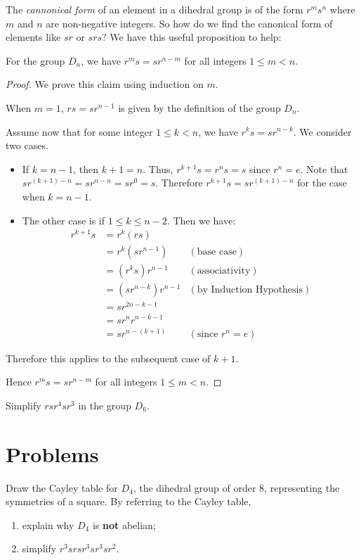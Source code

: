 The \textit{cannonical form} of an element in a dihedral group is of the form $r^ms^n$ where $m$ and $n$ are non-negative integers. So how do we find the canonical form of elements like $sr$ or $srs$? We have this useful proposition to help:
\begin{proposition}
    For the group $D_n$, we have $r^ms = sr^{n-m}$ for all integers $1 \leq m < n$.
\end{proposition}
\begin{proof}
    We prove this claim using induction on $m$.

    When $m = 1$, $rs = sr^{n-1}$ is given by the definition of the group $D_n$.

    Assume now that for some integer $1 \leq k < n$, we have $r^ks = sr^{n-k}$. We consider two cases.
    \begin{itemize}
        \item If $k = n - 1$, then $k + 1 = n$. Thus, $r^{k+1}s = r^ns = s$ since $r^n = e$. Note that $sr^{(k+1)-n} = sr^{n-n} = sr^0 = s$. Therefore $r^{k+1}s = sr^{(k+1)-n}$ for the case when $k = n - 1$.
        \item The other case is if $1 \leq k \leq n - 2$. Then we have:
        \begin{align*}
            r^{k+1}s &= r^k(rs)\\
            &= r^k(sr^{n-1}) & (\text{base case})\\
            &= (r^ks)r^{n-1} & (\text{associativity})\\
            &= (sr^{n-k})r^{n-1} & (\text{by Induction Hypothesis})\\
            &= sr^{2n - k - 1}\\
            &= sr^nr^{n-k-1}\\
            &= sr^{n-(k+1)} & (\text{since } r^n = e)
        \end{align*}
    \end{itemize}
    Therefore this applies to the subsequent case of $k+1$.

    Hence $r^ms = sr^{n-m}$ for all integers $1 \leq m < n$.
\end{proof}

\begin{exercise}
    Simplify $rsr^4sr^3$ in the group $D_6$.
\end{exercise}

\newpage

\section{Problems}
\begin{problem}
    Draw the Cayley table for $D_4$, the dihedral group of order 8, representing the symmetries of a square. By referring to the Cayley table,
    \begin{enumerate}[label=(\alph*)]
        \item explain why $D_4$ is \textbf{not} abelian;
        \item simplify $r^3srsr^3sr^3sr^2$.
    \end{enumerate}
\end{problem}

